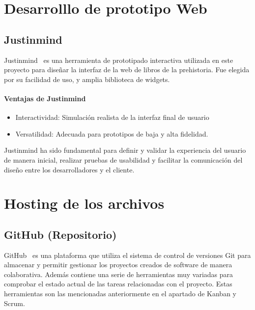 \section{Desarrolllo de prototipo Web}
\subsection{Justinmind}

Justinmind~\cite{Justinmind} es una herramienta de prototipado interactiva utilizada en este proyecto para diseñar la interfaz de la web de libros de la prehistoria. Fue elegida por su facilidad de uso, y amplia biblioteca de widgets.

\paragraph{Ventajas de Justinmind}

\begin{itemize}
    \item Interactividad: Simulación realista de la interfaz final de usuario
    \item Versatilidad: Adecuada para prototipos de baja y alta fidelidad.
\end{itemize}


Justinmind ha sido fundamental para definir y validar la experiencia del usuario de manera inicial, realizar pruebas de usabilidad y facilitar la comunicación del diseño entre los desarrolladores y el cliente.

 \section{Hosting de los archivos}
 \subsection{GitHub (Repositorio)}
 GitHub~\cite{Github} es una plataforma que utiliza el sistema de control de versiones Git para almacenar y permitir gestionar los proyectos creados de software de manera colaborativa. Además contiene una serie de herramientas muy variadas para comprobar el estado actual de las tareas relacionadas con el proyecto. Estas herramientas son las mencionadas anteriormente en el apartado de Kanban y Scrum.

